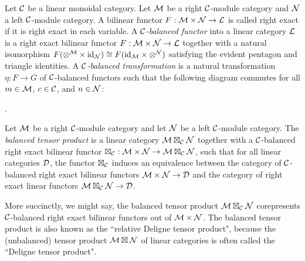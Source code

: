 \documentclass{amsart}
\begin{document}
\begin{definition}
	Let $\mathcal C$ be a linear monoidal category. 
	Let $\mathcal M$ be a right $\mathcal C$-module category and $\mathcal N$ a left $\mathcal C$-module category.  A bilinear functor $F: \mathcal M \times \mathcal N \to \mathcal L$ is called right exact if it is right exact in each variable.   A {\em $\mathcal C$-balanced functor} into a linear category $\mathcal L$ is a right exact bilinear functor $F: \mathcal M \times \mathcal N \to \mathcal L$ together with a natural isomorphism $F(\otimes^{\mathcal M} \times \mathrm{id}_{\mathcal N}) \cong F(\mathrm{id}_{\mathcal M} \times \otimes^{\mathcal N})$ satisfying the evident pentagon and triangle identities.
	A {\em $\mathcal C$-balanced transformation} is a natural transformation $\eta:F \to G$ of $\mathcal C$-balanced functors such that the following diagram commutes for all $m \in \mathcal M$, $c \in \mathcal C$, and $n \in \mathcal N$:
\begin{center}
.
\end{center}
\end{definition}

\begin{definition}
	Let $\mathcal M$ be a right $\mathcal C$-module category and let $\mathcal N$ be a left $\mathcal C$-module category. The {\em balanced tensor product} is a linear category $\mathcal M \boxtimes_{\mathcal C} \mathcal N$
	 together with a $\mathcal C$-balanced right exact bilinear functor $\boxtimes_{\mathcal C} : \mathcal M \times \mathcal N \to \mathcal M \boxtimes_{\mathcal C} \mathcal N$, such that for all linear categories $\mathcal D$, the functor $\boxtimes_{\mathcal C}$ induces an equivalence between the category of $\mathcal C$-balanced right exact bilinear functors $\mathcal M \times \mathcal N \to \mathcal D$ and the category of right exact linear functors $\mathcal M \boxtimes_{\mathcal C} \mathcal N \to \mathcal D$. 
\end{definition}
\nid More succinctly, we might say, the balanced tensor product $\mathcal M \boxtimes_{\mathcal C} \mathcal N$ corepresents $\mathcal C$-balanced right exact bilinear functors out of $\mathcal M \times \mathcal N$.  The balanced tensor product is also known as the ``relative Deligne tensor product", because the (unbalanced) tensor product $\mathcal M \boxtimes \mathcal N$ of linear categories is often called the ``Deligne tensor product".  
\end{document}
